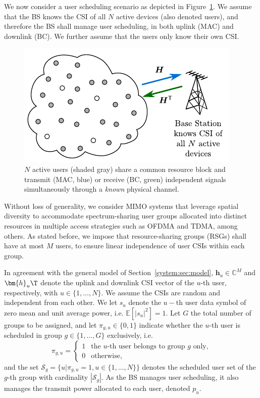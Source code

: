 We now consider a user scheduling scenario as depicted in Figure~\ref{system:fig:general_model_user_sch}. We assume that the BS knows the CSI of all $N$ active devices (also denoted users), and therefore the BS shall manage user scheduling, in both uplink (MAC) and downlink (BC). We further assume that the users only know their own CSI.
\begin{figure}[tbp]
	\centering
	\includegraphics[width=0.5\linewidth]{./figs/system_figs/general_model_user_sch.pdf}
	\caption{$N$ active users (shaded gray) share a common resource block and transmit (MAC, blue) or receive (BC, green) independent signals simultaneously through a \emph{known} physical channel.}\label{system:fig:general_model_user_sch}
\end{figure}

Without loss of generality, we consider MIMO systems that leverage spatial diversity to accommodate spectrum-sharing user groups allocated into distinct resources in multiple access strategies such as OFDMA and TDMA, among others. As stated before, we impose that resource-sharing groups (RSGs) shall have at most $M$ users, to ensure linear independence of user CSIs within each group.

In agreement with the general model of Section~\ref{system:sec:model}, $\bm{h}_{u}\in \mathbb{C}^{M}$ and $\bm{h}_u\T$ denote the uplink and downlink CSI vector of the $u$-th user, respectively, with $u\in\{1,\ldots,N\}$. We assume the CSIs are random and independent from each other. We let $s_{u}$ denote the $u-$th user data symbol of zero mean and unit average power, i.e. $\mathbb{E}\left[ {|{s_{u}}|^2} \right] = 1$. 
Let $G$ the total number of groups to be assigned, and let $\pi_{g,u}\in\{0,1\}$ indicate whether the $u$-th user is scheduled in group $g\in\{1,\ldots,G\}$ exclusively, i.e.
\begin{equation}
	{\pi _{g,u}} = \left\{ \begin{array}{ll}
		1&\text{the $u$-th user belongs to group $g$ only,}\\
		0&\text{otherwise,}
	\end{array} \right.
\end{equation}
and the set $\mathcal{S}_g=\{u|\pi_{g,u}=1, u\in\{1,\ldots,N\}\}$ denotes the scheduled user set of the $g$-th group with cardinality $|\mathcal{S}_g|$.
As the BS manages user scheduling, it also manages the transmit power allocated to each user, denoted $p_u$.

